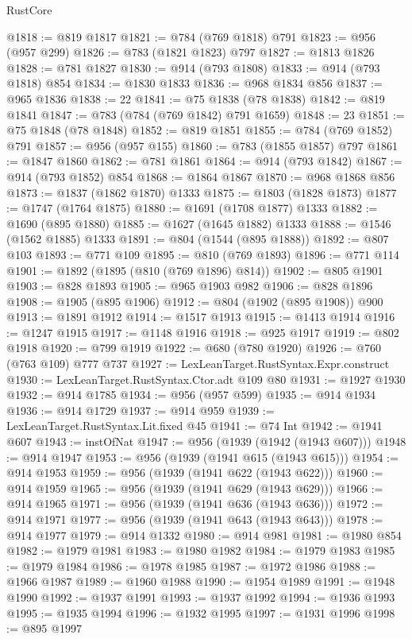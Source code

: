 \begin{lexlean}{RustCore}
\begin{coremodule}
@1818 := @819 @1817
@1821 := @784 (@769 @1818) @791
@1823 := @956 (@957 @299)
@1826 := @783 (@1821 @1823) @797
@1827 := @1813 @1826
@1828 := @781 @1827
@1830 := @914 (@793 @1808)
@1833 := @914 (@793 @1818) @854
@1834 := @1830 @1833
@1836 := @968 @1834 @856
@1837 := @965 @1836
@1838 := 22
@1841 := @75 @1838 (@78 @1838)
@1842 := @819 @1841
@1847 := @783 (@784 (@769 @1842) @791 @1659)
@1848 := 23
@1851 := @75 @1848 (@78 @1848)
@1852 := @819 @1851
@1855 := @784 (@769 @1852) @791
@1857 := @956 (@957 @155)
@1860 := @783 (@1855 @1857) @797
@1861 := @1847 @1860
@1862 := @781 @1861
@1864 := @914 (@793 @1842)
@1867 := @914 (@793 @1852) @854
@1868 := @1864 @1867
@1870 := @968 @1868 @856
@1873 := @1837 (@1862 @1870) @1333
@1875 := @1803 (@1828 @1873)
@1877 := @1747 (@1764 @1875)
@1880 := @1691 (@1708 @1877) @1333
@1882 := @1690 (@895 @1880)
@1885 := @1627 (@1645 @1882) @1333
@1888 := @1546 (@1562 @1885) @1333
@1891 := @804 (@1544 (@895 @1888))
@1892 := @807 @103
@1893 := @771 @109
@1895 := @810 (@769 @1893)
@1896 := @771 @114
@1901 := @1892 (@1895 (@810 (@769 @1896) @814))
@1902 := @805 @1901
@1903 := @828 @1893
@1905 := @965 @1903 @982
@1906 := @828 @1896
@1908 := @1905 (@895 @1906)
@1912 := @804 (@1902 (@895 @1908)) @900
@1913 := @1891 @1912
@1914 := @1517 @1913
@1915 := @1413 @1914
@1916 := @1247 @1915
@1917 := @1148 @1916
@1918 := @925 @1917
@1919 := @802 @1918
@1920 := @799 @1919
@1922 := @680 (@780 @1920)
@1926 := @760 (@763 @109) @777 @737
@1927 := LexLeanTarget.RustSyntax.Expr.construct
@1930 := LexLeanTarget.RustSyntax.Ctor.adt @109 @80
@1931 := @1927 @1930
@1932 := @914 @1785
@1934 := @956 (@957 @599)
@1935 := @914 @1934
@1936 := @914 @1729
@1937 := @914 @959
@1939 := LexLeanTarget.RustSyntax.Lit.fixed @45
@1941 := @74 Int
@1942 := @1941 @607
@1943 := instOfNat
@1947 := @956 (@1939 (@1942 (@1943 @607)))
@1948 := @914 @1947
@1953 := @956 (@1939 (@1941 @615 (@1943 @615)))
@1954 := @914 @1953
@1959 := @956 (@1939 (@1941 @622 (@1943 @622)))
@1960 := @914 @1959
@1965 := @956 (@1939 (@1941 @629 (@1943 @629)))
@1966 := @914 @1965
@1971 := @956 (@1939 (@1941 @636 (@1943 @636)))
@1972 := @914 @1971
@1977 := @956 (@1939 (@1941 @643 (@1943 @643)))
@1978 := @914 @1977
@1979 := @914 @1332
@1980 := @914 @981
@1981 := @1980 @854
@1982 := @1979 @1981
@1983 := @1980 @1982
@1984 := @1979 @1983
@1985 := @1979 @1984
@1986 := @1978 @1985
@1987 := @1972 @1986
@1988 := @1966 @1987
@1989 := @1960 @1988
@1990 := @1954 @1989
@1991 := @1948 @1990
@1992 := @1937 @1991
@1993 := @1937 @1992
@1994 := @1936 @1993
@1995 := @1935 @1994
@1996 := @1932 @1995
@1997 := @1931 @1996
@1998 := @895 @1997

\end{coremodule}
\end{lexlean}
